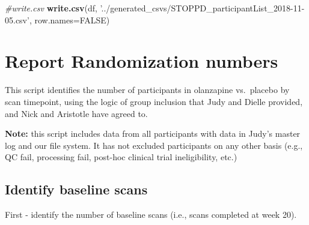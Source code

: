 \documentclass[]{article}
\newenvironment{Shaded}{\begin{snugshade}}{\end{snugshade}}
\newcommand{\KeywordTok}[1]{\textcolor[rgb]{0.13,0.29,0.53}{\textbf{#1}}}
\newcommand{\DataTypeTok}[1]{\textcolor[rgb]{0.13,0.29,0.53}{#1}}
\newcommand{\StringTok}[1]{\textcolor[rgb]{0.31,0.60,0.02}{#1}}
\newcommand{\CommentTok}[1]{\textcolor[rgb]{0.56,0.35,0.01}{\textit{#1}}}
\newcommand{\OtherTok}[1]{\textcolor[rgb]{0.56,0.35,0.01}{#1}}
\newcommand{\OperatorTok}[1]{\textcolor[rgb]{0.81,0.36,0.00}{\textbf{#1}}}
\newcommand{\NormalTok}[1]{#1}
\theoremstyle{definition}
\theoremstyle{definition}
\theoremstyle{definition}
\theoremstyle{remark}
\begin{document}
\begin{Shaded}
\begin{Highlighting}[]
\CommentTok{#write.csv}
\KeywordTok{write.csv}\NormalTok{(df, }\StringTok{'../generated_csvs/STOPPD_participantList_2018-11-05.csv'}\NormalTok{, }\DataTypeTok{row.names=}\OtherTok{FALSE}\NormalTok{)}
\end{Highlighting}
\end{Shaded}

\section{Report Randomization
numbers}\label{report-randomization-numbers}

This script identifies the number of participants in olanzapine
vs.~placebo by scan timepoint, using the logic of group inclusion that
Judy and Dielle provided, and Nick and Aristotle have agreed to.

\textbf{Note:} this script includes data from all participants with data
in Judy's master log and our file system. It has not excluded
participants on any other basis (e.g., QC fail, processing fail,
post-hoc clinical trial ineligibility, etc.)

\subsection{Identify baseline scans}\label{identify-baseline-scans}

First - identify the number of baseline scans (i.e., scans completed at
week 20).

\begin{Shaded}
\end{Shaded}
\end{document}
